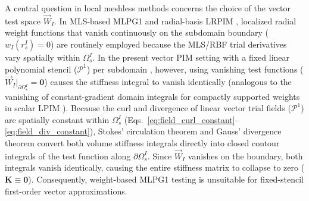 \documentclass[VANCOUVER,Times1COL]{WileyNJD-v5}
\begin{document}
A central question in local meshless methods concerns the choice of the vector test space $\vec{W}_I$. In MLS-based MLPG1 \cite{atluri1998new, atluri2002meshless} and radial-basis LRPIM \cite{liu2005introduction}, localized radial weight functions that vanish continuously on the subdomain boundary ($w_I(r_s^I) = 0$) are routinely employed because the MLS/RBF trial derivatives vary spatially within $\Omega_s^I$. In the present vector PIM setting with a fixed linear polynomial stencil ($\mathcal{P}^1$) per subdomain \cite{liu2001local, stable_vnmm2d_2026}, however, using vanishing test functions ($\vec{W}_I|_{\partial\Omega_s^I} = \mathbf{0}$) causes the stiffness integral to vanish identically (analogous to the vanishing of constant-gradient domain integrals for compactly supported weights in scalar LPIM \cite{liu2001local}). Because the curl and divergence of linear vector trial fields ($\mathcal{P}^1$) are spatially constant within $\Omega_s^I$ (Eqs.~\eqref{eq:field_curl_constant}--\eqref{eq:field_div_constant}), Stokes' circulation theorem and Gauss' divergence theorem convert both volume stiffness integrals directly into closed contour integrals of the test function along $\partial\Omega_s^I$. Since $\vec{W}_I$ vanishes on the boundary, both integrals vanish identically, causing the entire stiffness matrix to collapse to zero ($\mathbf{K} \equiv \mathbf{0}$). Consequently, weight-based MLPG1 testing is unsuitable for fixed-stencil first-order vector approximations.
\end{document}
